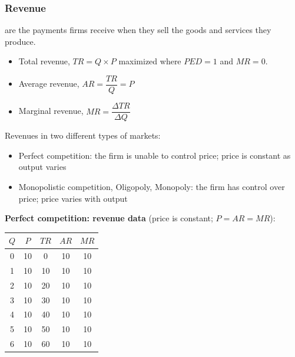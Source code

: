\subsubsection*{Revenue}
 are the payments firms receive when they sell the goods and services they produce. 
\begin{itemize}
  \item Total revenue, $TR=Q\times P$ maximized where $PED = 1$ and $MR = 0$.
  \item Average revenue, $AR=\dfrac{TR}{Q}=P$ 
  \item Marginal revenue, $MR=\dfrac{\Delta TR}{\Delta Q}$
\end{itemize}
Revenues in two different types of markets:
\begin{itemize}
  \item Perfect competition: the firm is unable to control price; price is constant as output varies
  \item Monopolistic competition, Oligopoly, Monopoly: the firm has control over price; price varies with output
\end{itemize}
\textbf{Perfect competition: revenue data} (price is constant; $P = AR = MR$):
\begin{center}
\begin{tabular}{ccccc}
\toprule
$Q$ & $P$ & $TR$ & $AR$ & $MR$ \\
\midrule
0 & 10 & 0  & 10 & 10 \\
1 & 10 & 10 & 10 & 10 \\
2 & 10 & 20 & 10 & 10 \\
3 & 10 & 30 & 10 & 10 \\
4 & 10 & 40 & 10 & 10 \\
5 & 10 & 50 & 10 & 10 \\
6 & 10 & 60 & 10 & 10 \\
\bottomrule
\end{tabular}
\end{center}
\begin{center}
\end{center}
